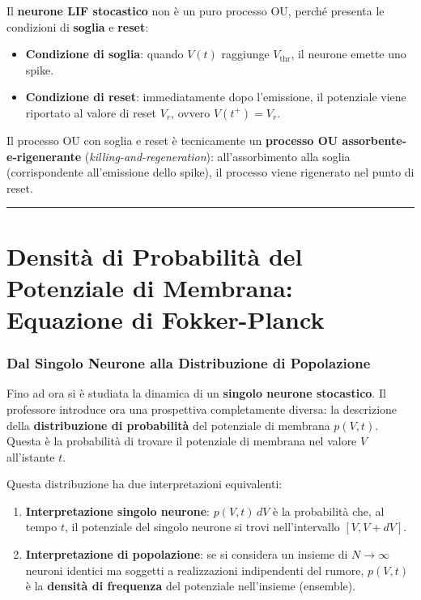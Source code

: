 Il \textbf{neurone LIF stocastico} non è un puro processo OU, perché presenta le condizioni di \textbf{soglia} e \textbf{reset}:
\begin{itemize}
    \item \textbf{Condizione di soglia}: quando $V(t)$ raggiunge $V_{\text{thr}}$, il neurone emette uno spike.
    \item \textbf{Condizione di reset}: immediatamente dopo l'emissione, il potenziale viene riportato al valore di reset $V_r$, ovvero $V(t^+) = V_r$.
\end{itemize}

Il processo OU con soglia e reset è tecnicamente un \textbf{processo OU assorbente-e-rigenerante} (\textit{killing-and-regeneration}): all'assorbimento alla soglia (corrispondente all'emissione dello spike), il processo viene rigenerato nel punto di reset.

\vspace{0.5cm}
\noindent\rule{\textwidth}{0.4pt}
\vspace{0.5cm}

\section{Densità di Probabilità del Potenziale di Membrana: Equazione di Fokker-Planck}

\subsubsection{Dal Singolo Neurone alla Distribuzione di Popolazione}

Fino ad ora si è studiata la dinamica di un \textbf{singolo neurone stocastico}. Il professore introduce ora una prospettiva completamente diversa: la descrizione della \textbf{distribuzione di probabilità} del potenziale di membrana $p(V, t)$. Questa è la probabilità di trovare il potenziale di membrana nel valore $V$ all'istante $t$.

Questa distribuzione ha due interpretazioni equivalenti:
\begin{enumerate}
    \item \textbf{Interpretazione singolo neurone}: $p(V, t)\, dV$ è la probabilità che, al tempo $t$, il potenziale del singolo neurone si trovi nell'intervallo $[V, V + dV]$.
    \item \textbf{Interpretazione di popolazione}: se si considera un insieme di $N \to \infty$ neuroni identici ma soggetti a realizzazioni indipendenti del rumore, $p(V, t)$ è la \textbf{densità di frequenza} del potenziale nell'insieme (ensemble).
\end{enumerate}

